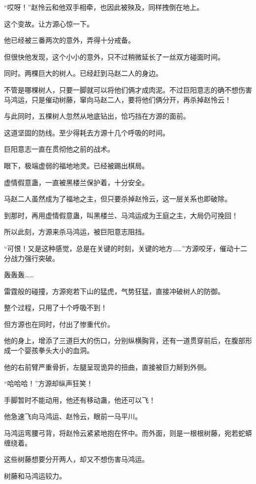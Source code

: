 \begin{this_body}
“哎呀！”赵怜云和他双手相牵，也因此被殃及，同样拽倒在地上。

这个变故。让方源心惊一下。

他已经被三番两次的意外，弄得十分戒备。

但很快他发现，这个小小的意外，只不过稍微延长了一丝双方碰面时间。

同时。两棵巨大的树人。已经赶到马赵二人的身边。

不管是哪棵树人，只要一脚就可以将他们俩才成肉泥。不过巨阳意志的确不想伤害马鸿运，只是催动树藤，窜向马赵二人，要将他们俩分开，再杀掉赵怜云！

与此同时，五棵树人忽然从地底钻出，恰巧挡在方源的面前。

这道坚固的防线。至少得耗去方源十几个呼吸的时间。

巨阳意志一直在贯彻他之前的战术。

眼下，极端虚弱的福地地灵。已经被踢出棋局。

虚情假意蛊，一直被黑楼兰保护着，十分安全。

马赵二人虽然成为了福地之主，但只要杀掉赵怜云，这一层关系也即破除。

到那时，再用虚情假意蛊，叫黑楼兰、马鸿运成为王庭之主，大局仍可挽回！

所以此刻，方源来杀马鸿运，被巨阳意志阻挡。

“可恨！又是这种感觉，总是在关键的时刻，关键的地方……”方源咬牙，催动十二分战力强行突破。

轰轰轰……

雷霆般的碰撞，方源宛若下山的猛虎，气势狂猛，直接冲破树人的防御。

整个过程，只用了十个呼吸不到！

但方源也在同时，付出了惨重代价。

他的身上，增添了三道巨大的伤口，分别纵横胸背，还有一道贯穿前后，在腹部形成一个婴孩拳头大小的血洞。

他的右前臂严重骨折，左腿呈现诡异的扭曲，直接被巨力掰到外侧。

“哈哈哈！”方源却纵声狂笑！

手脚暂时不能动用，他还有移动蛊，他还可以飞！

他急速飞向马鸿运、赵怜云，眼前一马平川。

马鸿运弯腰弓背，将赵怜云紧紧地抱在怀中。而外面，则是一根根树藤，宛若蛇蟒缠绕着。

这些树藤想要分开两人，却又不想伤害马鸿运。

树藤和马鸿运较力。


\end{this_body}
